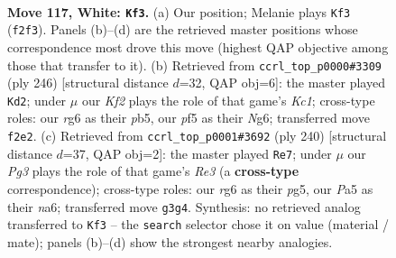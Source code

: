 \documentclass[11pt]{article}
\begin{document}
\begin{figure}[p]\centering
\begin{subfigure}{0.46\textwidth}\centering
\resizebox{\linewidth}{!}{%
\newchessgame
\chessboard[
  setfen={3k4/8/p5r1/P1p2p1p/1p3P1P/1P2P1P1/5K2/7R w - - 21 117},
  showmover=false,
  pgfstyle=straightmove, color=movearrow, markmove={f2-f3}
]}
\caption{}
\end{subfigure}\hfill
\begin{subfigure}{0.46\textwidth}\centering
\resizebox{\linewidth}{!}{%
\newchessgame
\chessboard[
  setfen={8/1b6/3k2N1/1p3p2/p1pP1Pp1/P1P3P1/1P6/2K5 w - - 29 124},
  showmover=false,
  pgfstyle=straightmove, color=movearrow, markmove={c1-d2}
]}
\caption{}
\end{subfigure}
\\[4pt]
\begin{subfigure}{0.46\textwidth}\centering
\resizebox{\linewidth}{!}{%
\newchessgame
\chessboard[
  setfen={5k2/8/n1Bp1P1p/p1p3p1/P1P3P1/1P2R2K/8/3r4 w - - 1 121},
  showmover=false,
  pgfstyle=straightmove, color=movearrow, markmove={e3-e7}
]}
\caption{}
\end{subfigure}\hfill

\caption{\textbf{Move 117, White: \texttt{Kf3}.} (a) Our position; Melanie plays \texttt{Kf3} (\texttt{f2f3}). Panels (b)--(d) are the retrieved master positions whose correspondence most drove this move (highest QAP objective among those that transfer to it). (b) Retrieved from \texttt{ccrl\_top\_p0000\#3309} (ply 246) [structural distance $d$=32, QAP obj=6]: the master played \texttt{Kd2}; under $\mu$ our \emph{Kf2} plays the role of that game's \emph{Kc1}; cross-type roles: our \emph{r}g6 as their \emph{p}b5, our \emph{p}f5 as their \emph{N}g6; transferred move \texttt{f2e2}. (c) Retrieved from \texttt{ccrl\_top\_p0001\#3692} (ply 240) [structural distance $d$=37, QAP obj=2]: the master played \texttt{Re7}; under $\mu$ our \emph{Pg3} plays the role of that game's \emph{Re3} (a \textbf{cross-type} correspondence); cross-type roles: our \emph{r}g6 as their \emph{p}g5, our \emph{P}a5 as their \emph{n}a6; transferred move \texttt{g3g4}. Synthesis: no retrieved analog transferred to \texttt{Kf3} -- the \texttt{search} selector chose it on value (material / mate); panels (b)--(d) show the strongest nearby analogies.}
\label{fig:thought-m232}
\end{figure}

\clearpage
\end{document}
